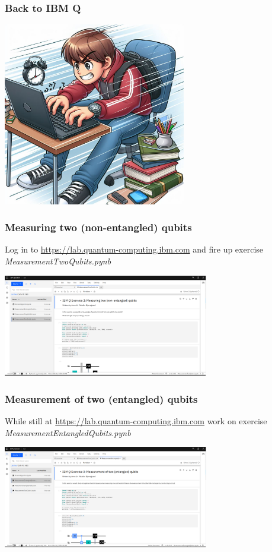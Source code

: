 \documentclass[10pt]{beamer}
\begin{document}
\begin{frame}
  \frametitle{Back to IBM Q}
  \centering
  \includegraphics[width=8cm]{img/typing.jpg}
\end{frame}

\begin{frame}
  \frametitle{Measuring two (non-entangled) qubits}
  Log in to \href{https://lab.quantum-computing.ibm.com}{https://lab.quantum-computing.ibm.com} and fire up exercise \emph{MeasurementTwoQubits.pynb}

  \begin{center}
\includegraphics[width=9cm]{img/ibmq-two-qubit.png}
    \end{center}
\end{frame}

\begin{frame}
  \frametitle{Measurement of two (entangled) qubits}
While still at \href{https://lab.quantum-computing.ibm.com}{https://lab.quantum-computing.ibm.com} work on exercise \emph{MeasurementEntangledQubits.pynb}

  \begin{center}
\includegraphics[width=9cm]{img/ibmq-entangled-qubits.png}
    \end{center}
\end{frame}
\end{document}
